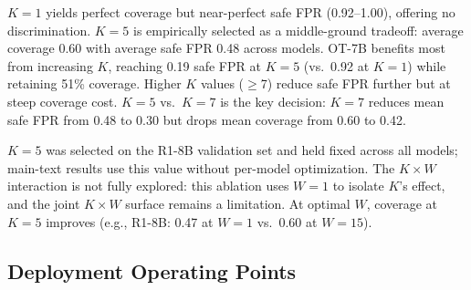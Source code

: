 \begin{table}[htbp]
\centering
\small
\caption{Detection threshold ablation ($W{=}1$, HS probes at threshold-based layers). Coverage: fraction of jailbreak traces with $\geq K$ consecutive crossings. Safe FPR: fraction of safe traces with $\geq K$ consecutive false alarms.}
\label{tab:k_ablation}
\setlength{\tabcolsep}{3pt}
\end{table}

$K{=}1$ yields perfect coverage but near-perfect safe FPR (0.92--1.00), offering no discrimination. $K{=}5$ is empirically selected as a middle-ground tradeoff: average coverage 0.60 with average safe FPR 0.48 across models. OT-7B benefits most from increasing $K$, reaching 0.19 safe FPR at $K{=}5$ (vs.\ 0.92 at $K{=}1$) while retaining 51\% coverage. Higher $K$ values ($\geq$7) reduce safe FPR further but at steep coverage cost. $K{=}5$ vs.\ $K{=}7$ is the key decision: $K{=}7$ reduces mean safe FPR from 0.48 to 0.30 but drops mean coverage from 0.60 to 0.42.

$K{=}5$ was selected on the R1-8B validation set and held fixed across all models; main-text results use this value without per-model optimization. The $K \times W$ interaction is not fully explored: this ablation uses $W{=}1$ to isolate $K$'s effect, and the joint $K \times W$ surface remains a limitation. At optimal $W$, coverage at $K{=}5$ improves (e.g., R1-8B: 0.47 at $W{=}1$ vs.\ 0.60 at $W{=}15$).

\subsection{Deployment Operating Points}
\label{app:deployment_operating_points}

